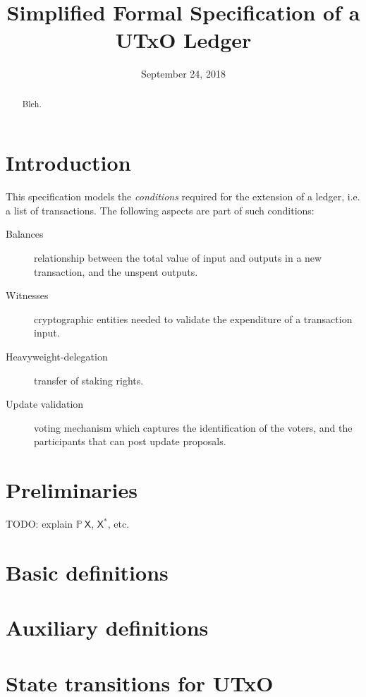 \documentclass[11pt,a4paper]{article}
\newcommand{\powerset}[1]{\mathbb{P}~#1}
\newcommand{\type}[1]{\mathsf{#1}}
\newcommand{\listOf}[1]{#1^{*}}
\begin{document}
\title{Simplified Formal Specification of a UTxO Ledger}

\author{}

\date{September 24, 2018}

\begin{abstract}
Bleh.
\end{abstract}

\section{Introduction}
\label{sec:introduction}

This specification models the \textit{conditions} required for the extension of
a ledger, i.e. a list of transactions. The following aspects are part of such
conditions:

\begin{description}
\item[Balances] relationship between the total value of input and outputs
  in a new transaction, and the unspent outputs.
\item[Witnesses] cryptographic entities needed to validate the expenditure
  of a transaction input.
\item[Heavyweight-delegation] transfer of staking rights.
\item[Update validation] voting mechanism which captures the identification of
  the voters, and the participants that can post update proposals.
\end{description}

\section{Preliminaries}\label{sec:preliminaries}

TODO: explain  $\powerset{\type{X}}$, $\listOf{\type{X}}$, etc.


\section{Basic definitions}
\label{sec:basic-definitions}

\section{Auxiliary definitions}
\label{sec:auxil-defin}

\section{State transitions for UTxO}
\label{sec:state-trans-utxo-1}
\end{document}
